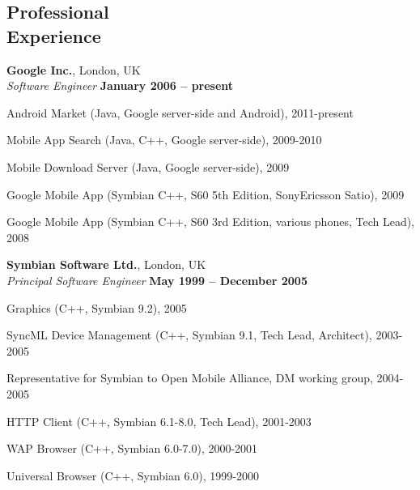 \documentclass[margin,line]{resume}
\begin{document}
\begin{resume}
    \section{\mysidestyle Professional\\Experience}

    \textbf{Google Inc.}, London, UK \vspace{2mm}\\\vspace{1mm}%
    \textsl{Software Engineer} \hfill \textbf{January 2006 -- present}\vspace{-3mm}\\\vspace{-1mm}%
    \begin{list2}
        \item Android Market (Java,  Google server-side and Android), 2011-present
        \item Mobile App Search (Java, C++, Google server-side), 2009-2010
        \item Mobile Download Server (Java, Google server-side), 2009
        \item Google Mobile App (Symbian C++, S60 5th Edition, SonyEricsson Satio), 2009
        \item Google Mobile App (Symbian C++, S60 3rd Edition, various phones, Tech Lead), 2008
    \end{list2}\vspace{-1.5mm}

    \textbf{Symbian Software Ltd.}, London, UK \vspace{2mm}\\\vspace{1mm}%
    \textsl{Principal Software Engineer} \hfill \textbf{May 1999 -- December 2005}\vspace{-3mm}\\\vspace{-1mm}%
    \begin{list2}
        \item Graphics (C++, Symbian 9.2), 2005
        \item SyncML Device Management (C++, Symbian 9.1, Tech Lead, Architect), 2003-2005
        \item Representative for Symbian to Open Mobile Alliance, DM working group, 2004-2005
        \item HTTP Client (C++, Symbian 6.1-8.0, Tech Lead), 2001-2003
        \item WAP Browser (C++, Symbian 6.0-7.0), 2000-2001
        \item Universal Browser (C++, Symbian 6.0), 1999-2000
    \end{list2}\vspace{-1.5mm}
   

\end{resume}
\end{document}
